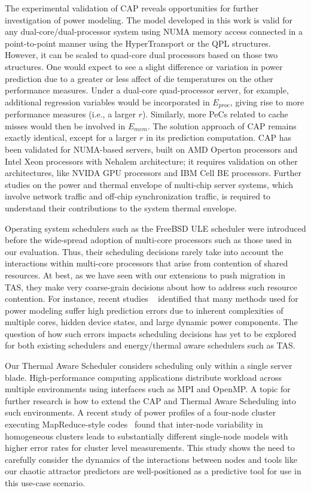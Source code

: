 The experimental validation of CAP reveals opportunities for further
investigation of power modeling. The model developed in this work is
valid for any dual-core/dual-processor system using NUMA memory access
connected in a point-to-point manner using the HyperTransport or the QPL
structures.  However, it can be scaled to quad-core dual processors
based on those two structures.  One would expect to see a slight
difference or variation in power prediction due to a greater or less
affect of die temperatures on the other performance measures.  Under a
dual-core quad-processor server, for example, additional regression
variables would be incorporated in $E_{proc}$, giving rise to more
performance measures (i.e., a larger $r$).  Similarly, more PeCs related
to cache misses would then be involved in $E_{mem}$.  The solution
approach of CAP remains exactly identical, except for a larger $r$ in
its prediction computation.  CAP has been validated for NUMA-based
servers, built on AMD Operton processors and Intel Xeon processors with
Nehalem architecture; it requires validation on other architectures,
like NVIDA GPU processors and IBM Cell BE processors.  Further studies
on the power and thermal envelope of multi-chip server systems, which
involve network traffic and off-chip synchronization traffic, is
required to understand their contributions to the system thermal
envelope.

Operating system schedulers such as the FreeBSD ULE scheduler were
introduced before the wide-spread adoption of multi-core processors such
as those used in our evaluation.   Thus, their scheduling decisions rarely
take into account the interactions within multi-core processors that
arise from contention of shared resources.   At best, as we have seen
with our extensions to push migration in TAS, they make very
coarse-grain decisions about how to address such resource contention.
For instance, recent studies ~\cite{McCullough2011}
identified that many methods used for power modeling suffer high
prediction errors due to inherent complexities of multiple cores, hidden
device states, and large dynamic power components.  The question of how
such errors impacts scheduling decisions has yet to be explored for both
existing schedulers and energy/thermal aware schedulers such as TAS.

Our Thermal Aware Scheduler considers scheduling only within a single
server blade. High-performance computing applications distribute
workload across multiple environments using interfaces such as MPI and
OpenMP.  A topic for further research is how to extend the CAP and
Thermal Aware Scheduling into such environments.   A recent study of
power profiles of a four-node cluster executing  MapReduce-style
codes~\cite{DavisRivoire2011} found that inter-node variability in
homogeneous clusters leads to substantially different single-node models
with higher error rates for cluster level measurements.  This study
shows the need to carefully consider the dynamics of the interactions
between nodes and tools like our chaotic attractor predictors are
well-positioned as a predictive tool for use in this use-case scenario.

